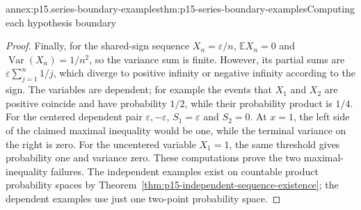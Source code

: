 \begin{annexitem}{annex:p15.series-boundary-examples}{thm:p15-series-boundary-examples}{Computing each hypothesis boundary}
\begin{proof}
Finally, for the shared-sign sequence \(X_n=\varepsilon/n\),
\(\mathbb EX_n=0\) and \(\operatorname{Var}(X_n)=1/n^2\),
so the variance sum is finite. However, its partial sums are
\(\varepsilon\sum_{j=1}^n1/j\), which diverge to positive
infinity or negative infinity according to the sign. The variables
are dependent; for example the events that \(X_1\) and \(X_2\)
are positive coincide and have probability \(1/2\), while their
probability product is \(1/4\).
For the centered dependent pair \(\varepsilon,-\varepsilon\),
\(S_1=\varepsilon\) and \(S_2=0\). At \(x=1\), the left
side of the claimed maximal inequality would be one, while the
terminal variance on the right is zero. For the uncentered variable
\(X_1=1\), the same threshold gives probability one and variance
zero. These computations prove the two maximal-inequality failures.
The independent examples exist on countable product probability
spaces by Theorem~\ref{thm:p15-independent-sequence-existence};
the dependent examples use just one two-point probability space.
\end{proof}
\end{annexitem}

